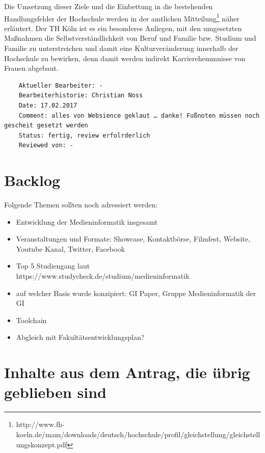 Die Umsetzung dieser Ziele und die Einbettung in die bestehenden
Handlungsfelder der Hochschule werden in der amtlichen
Mitteilung\footnote{http://www.fh-koeln.de/mam/downloads/deutsch/hochschule/profil/gleichstellung/gleichstellungskonzept.pdf}
näher erläutert. Der TH Köln ist es ein besonderes Anliegen, mit den
umgesetzten Maßnahmen die Selbstverständlichkeit von Beruf und Familie
bzw. Studium und Familie zu unterstreichen und damit eine
Kulturveränderung innerhalb der Hochschule zu bewirken, denn damit
werden indirekt Karrierehemmnisse von Frauen abgebaut.

\begin{verbatim}
    Aktueller Bearbeiter: -
    Bearbeiterhistorie: Christian Noss
    Date: 17.02.2017
    Comment: alles von Websience geklaut … danke! Fußnoten müssen noch gescheit gesetzt werden
    Status: fertig, review erfolrderlich
    Reviewed von: -
\end{verbatim}

\chapter{Backlog}\label{backlog}

Folgende Themen sollten noch adressiert werden:

\begin{itemize}
\tightlist
\item
  Entwicklung der Medieninformatik insgesamt
\item
  Veranstaltungen und Formate: Showcase, Kontaktbörse, Filmfest,
  Website, Youtube Kanal, Twitter, Facebook
\item
  Top 5 Studiengang laut
  https://www.studycheck.de/studium/medieninformatik
\item
  auf welcher Basis wurde konzipiert: GI Paper, Gruppe Medieninformatik
  der GI
\item
  Toolchain
\item
  Abgleich mit Fakultätsentwicklungsplan?
\end{itemize}

\chapter{Inhalte aus dem Antrag, die übrig geblieben
sind}\label{inhalte-aus-dem-antrag-die-uxfcbrig-geblieben-sind}

